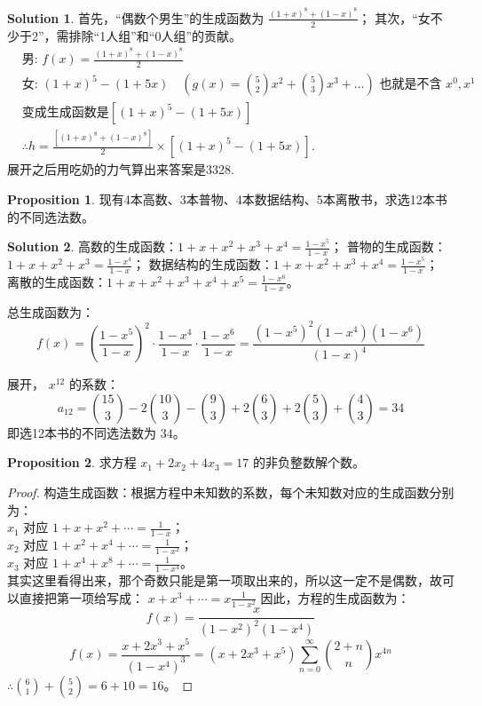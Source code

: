 \documentclass[oneside]{book}
\theoremstyle{definition}
\newtheorem{proposition}{Proposition}[section]
\newtheorem*{sol}{Solution}
\begin{document}
\begin{sol}
	首先，“偶数个男生”的生成函数为 \( \frac{(1 + x)^8 + (1 - x)^8}{2} \)；
	其次，“女不少于2”，需排除“1人组”和“0人组”的贡献。
	\[
	\begin{aligned}
		&\text{男: } f(x) = \frac{(1+x)^8 + (1-x)^8}{2} \\
		&\text{女: } (1+x)^5 - (1+5x) \quad (g(x) = \binom{5}{2}x^2 + \binom{5}{3}x^3 + \dots) \text{ 也就是不含 } x^0, x^1\\
		&\text{变成生成函数是}[(1+x)^5 - (1+5x)]\\
		&\therefore h = \frac{[(1+x)^8 + (1-x)^8]}{2} \times [(1+x)^5 - (1+5x)] .
	\end{aligned}
	\]
	展开之后用吃奶的力气算出来答案是3328.
\end{sol}

\begin{proposition}
	现有4本高数、3本普物、4本数据结构、5本离散书，求选12本书的不同选法数。
\end{proposition}

\begin{sol}
	高数的生成函数：\( 1 + x + x^2 + x^3 + x^4 = \frac{1 - x^5}{1 - x} \)；
	普物的生成函数：\( 1 + x + x^2 + x^3 = \frac{1 - x^4}{1 - x} \)；
	数据结构的生成函数：\( 1 + x + x^2 + x^3 + x^4 = \frac{1 - x^5}{1 - x} \)；
	离散的生成函数：\( 1 + x + x^2 + x^3 + x^4 + x^5 = \frac{1 - x^6}{1 - x} \)。
	
	总生成函数为：
	\[
	f(x) = \left( \frac{1 - x^5}{1 - x} \right)^2 \cdot \frac{1 - x^4}{1 - x} \cdot \frac{1 - x^6}{1 - x} = \frac{(1 - x^5)^2 (1 - x^4) (1 - x^6)}{(1 - x)^4}
	\]
	
	展开， \( x^{12} \) 的系数：
	\[
	a_{12} = \binom{15}{3} - 2\binom{10}{3} - \binom{9}{3} + 2\binom{6}{3} + 2\binom{5}{3} + \binom{4}{3} = 34
	\]
	即选12本书的不同选法数为 \( 34 \)。
\end{sol}
\begin{proposition}
	求方程 \( x_1 + 2x_2 + 4x_3 =1 7 \) 的非负整数解个数。
\end{proposition}

\begin{proof}
	构造生成函数：根据方程中未知数的系数，每个未知数对应的生成函数分别为：\\
	\( x_1 \) 对应 \( 1 + x + x^2 + \cdots = \frac{1}{1 - x} \)；\\
	\( x_2 \) 对应 \( 1 + x^2 + x^4 + \cdots = \frac{1}{1 - x^2} \)；\\
	\( x_3 \) 对应 \( 1 + x^4 + x^8 + \cdots = \frac{1}{1 - x^4} \)。\\
	其实这里看得出来，那个奇数只能是第一项取出来的，所以这一定不是偶数，故可以直接把第一项给写成：
	\(  x + x^3 + \cdots = x\frac{1}{1 - x^2} \)
	因此，方程的生成函数为：
	\[
	f(x) = \frac{x}{(1 - x^2)^2(1 - x^4)}
	\]
	\[
	f(x) = \frac{x + 2x^3 + x^5}{(1 - x^4)^3}=(x + 2x^3 + x^5)\sum_{n=0}^{\infty}\binom{2+n}{n}x^{4n}
	\]
 \(\therefore \binom{6}{1} + \binom{5}{2} = 6 + 10 = 16 \)。
\end{proof}
\end{document}
